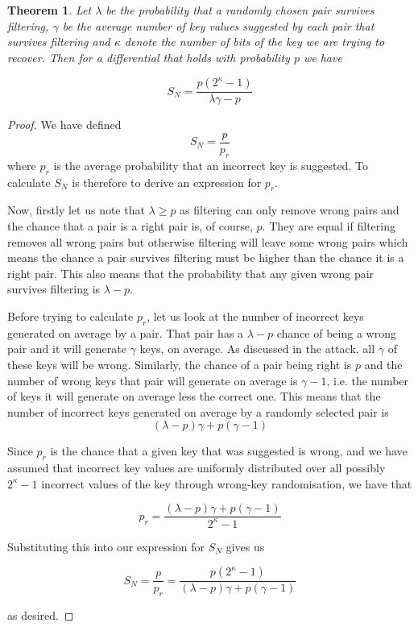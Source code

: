 \documentclass[12pt,a4paper]{article}
\newtheorem{theorem}{Theorem}
\begin{document}
\begin{theorem}
Let $\lambda$ be the probability that a randomly chosen pair survives filtering,
$\gamma$ be the average number of key values suggested by each pair that
survives filtering and $\kappa$ denote the number of bits of the key we are
trying to recover. Then for a differential that holds with probability $p$ we
have

\[S_N = \frac{p(2^\kappa -1)}{\lambda \gamma -p}\]
\end{theorem}
\begin{proof}
We have defined 
\[S_N = \frac{p}{p_r}\] 
where $p_r$ is the average probability that an incorrect key is suggested. To
calculate $S_N$ is therefore to derive an expression for $p_r$. 

Now, firstly let us note that $\lambda \geq p$ as filtering can only remove
wrong pairs and the chance that a pair is a right pair is, of course, $p$. They
are equal if filtering removes all wrong pairs but otherwise filtering will
leave some wrong pairs which means the chance a pair survives filtering must be
higher than the chance it is a right pair. This also means that the probability that
any given wrong pair survives filtering is $\lambda - p$.

Before trying to calculate $p_r$, let us look at the number of incorrect keys generated on average by a
pair. That pair has a $\lambda - p$ chance of being a wrong pair and it will
generate $\gamma$ keys, on average. As discussed in the attack, all $\gamma$ of
these keys will be wrong. Similarly, the chance of a pair being right is $p$
and the number of wrong keys that pair will generate on average is $\gamma -1$,
i.e. the number of keys it will generate on average less the correct one. This
means that the number of incorrect keys generated on average by a randomly
selected pair is 
\[(\lambda - p) \gamma + p (\gamma - 1)\]

Since $p_r$ is the chance that a given key that was suggested is wrong, and
we have assumed that incorrect key values are uniformly distributed over all
possibly $2^\kappa -1$ incorrect values of the key through wrong-key
randomisation, we have that 

\[p_r = \frac{(\lambda - p) \gamma + p (\gamma - 1)}{2^\kappa - 1}\]

Substituting this into our expression for $S_N$ gives us

\[S_N = \frac{p}{p_r} = \frac{p(2^\kappa - 1)}{(\lambda - p) \gamma + p (\gamma - 1)}\] 

as desired.
\end{proof}
\end{document}
